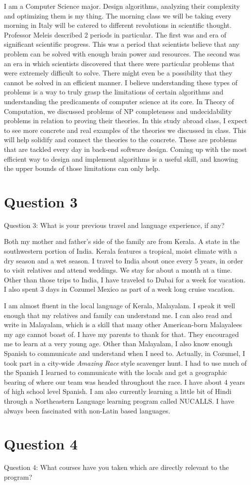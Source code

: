 \documentclass{article}
\begin{document}
I am a Computer Science major. Design algorithms, analyzing their complexity and
optimizing them is my thing. The morning class we will be taking every morning
in Italy will be catered to different revolutions in  scientific thought.
Professor Meleis described 2 periods in particular. The first was and era of
significant scientific progress. This was a period that scientists believe that
any problem can be solved with enough brain power and resources. The second was
an era in which scientists discovered that there were particular problems that
were extremely difficult to solve. There might even be a possibility that they
cannot be solved in an efficient manner. I believe understanding these types of
problems is a way to truly grasp the limitations of certain algorithms and
understanding the predicaments of computer science at its core. In Theory of
Computation, we discussed problems of NP completeness and undecidability
problems in relation to proving their theories. In this study abroad class, I
expect to see more concrete and real examples of the theories we discussed in
class. This will help solidify and connect the theories to the concrete. These
are problems that are tackled every day in back-end software design. Coming up
with the most efficient way to design and implement algorithms is a useful
skill, and knowing the upper bounds of those limitations can only help. 

\section{Question 3} Question 3: What is your previous travel and language
experience, if any?

Both my mother and father's side of the family are from Kerala. A state in the
southwestern portion of India. Kerala features a tropical, moist climate with a
dry season and a wet season. I travel to India about once every 5 years, in
order to visit relatives and attend weddings. We stay for about a month at a
time. Other than those trips to India, I have traveled to Dubai for a week for
vacation. I also spent 3 days in Cozumel Mexico as part of a week long cruise
vacation.

I am almost fluent in the local language of Kerala, Malayalam. I speak it well
enough that my relatives and family can understand me. I can also read and write
in Malayalam, which is a skill that many other American-born Malayalees my age
cannot boast of. I have my parents to thank for that. They encouraged me to
learn at a very young age. Other than Malayalam, I also know enough Spanish to
communicate and understand when I need to. Actually, in Cozumel, I took part in
a city-wide \textit{Amazing Race} style scavenger hunt. I had to use much of the
Spanish I learned to communicate with the locals and get a geographic bearing of
where our team was headed throughout the race. I have about 4 years of high
school level Spanish. I am also currently learning a little bit of Hindi through
a Northeastern Language learning program called NUCALLS. I have always been
fascinated with non-Latin based languages. 

\section{Question 4} Question 4: What courses have you taken which are directly
relevant to the program?
\end{document}
